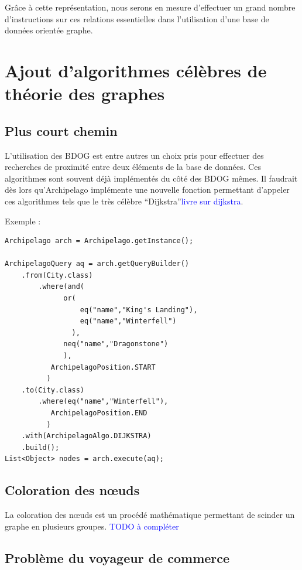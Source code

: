 \documentclass[a4paper,fleqn,12pt]{report}
\begin{document}
Grâce à cette représentation, nous serons en mesure d'effectuer un grand nombre d'instructions sur ces relations essentielles dans l'utilisation d'une base de données orientée graphe.

\section{Ajout d'algorithmes célèbres de théorie des graphes}

\subsection*{Plus court chemin}

L'utilisation des BDOG est entre autres un choix pris pour effectuer des recherches de proximité entre deux éléments de la base de données. Ces algorithmes sont souvent déjà implémentés du côté des BDOG mêmes. Il faudrait dès lors qu'Archipelago implémente une nouvelle fonction permettant d'appeler ces algorithmes tels que le très célèbre \enquote{Dijkstra}\textcolor{blue}{livre sur dijkstra}. 

Exemple : 

\begin{lstlisting}
Archipelago arch = Archipelago.getInstance();

ArchipelagoQuery aq = arch.getQueryBuilder()
    .from(City.class)
    	.where(and(
              or(
      	          eq("name","King's Landing"),
    	          eq("name","Winterfell")
    	        ),
    	      neq("name","Dragonstone")
    	      ),
    	   ArchipelagoPosition.START
    	  )
    .to(City.class)
    	.where(eq("name","Winterfell"),
    	   ArchipelagoPosition.END
    	  )
    .with(ArchipelagoAlgo.DIJKSTRA)
    .build();
List<Object> nodes = arch.execute(aq);
\end{lstlisting}

\subsection*{Coloration des nœuds}

La coloration des nœuds est un procédé mathématique permettant de scinder un graphe en plusieurs groupes.
\textcolor{blue}{TODO à compléter}

\subsection*{Problème du voyageur de commerce}
\end{document}
